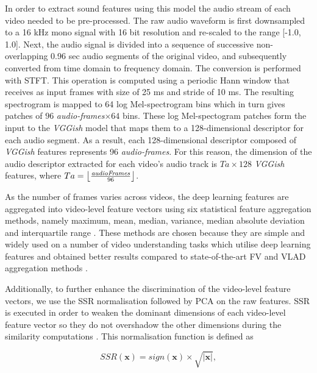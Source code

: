 \documentclass[review]{elsarticle}
\DeclarePairedDelimiter\floor{\lfloor}{\rfloor}
\begin{document}
\begin{enumerate}[label = \Alph*.]
In order to extract sound features using this model the audio stream of each video needed to be pre-processed. The raw audio waveform is first downsampled to a 16 kHz mono signal with 16 bit resolution and re-scaled to the range [-1.0, 1.0]. Next, the audio signal is divided into a sequence of successive non-overlapping 0.96 sec audio segments of the original video, and subsequently converted from time domain to frequency domain. The conversion is performed with \ac{STFT}. This operation is computed using a periodic Hann window that receives as input frames with size of 25 ms and stride of 10 ms. The resulting spectrogram is mapped to 64 log Mel-spectrogram bins which in turn gives patches of $96$ \textit{audio-frames}$\times 64$ bins. These log Mel-spectogram patches form the input to the \textit{VGGish} model that maps them to a 128-dimensional descriptor for each audio segment. As a result, each 128-dimensional descriptor composed of \textit{VGGish} features represents 96 \textit{audio-frames}. For this reason, the dimension of the audio descriptor extracted for each video's audio track is $Ta \times 128$ \textit{VGGish} features, where $Ta = \floor*{\frac{\mathit{audioFrames}}{96}}$.

\end{enumerate}


As the number of frames varies across videos, the deep learning features are aggregated into video-level feature vectors using six statistical feature aggregation methods, namely maximum, mean, median, variance, median absolute deviation and interquartile range \citep{almeida2020visual}. These methods are chosen because they are simple and widely used on a number of video understanding tasks which utilise deep learning features \citep{liu2019use, miech2019howto100m, almeida2020visual} and obtained better results compared to state-of-the-art \ac{FV} and \ac{VLAD} aggregation methods \citep{abu2016youtube,deldjoo2019movie}. 

Additionally, to further enhance the discrimination of the video-level feature vectors, we use the \ac{SSR} normalisation followed by \ac{PCA} on the raw features. \ac{SSR} is executed in order to weaken the dominant dimensions of each video-level feature vector so they do not overshadow the other dimensions during the similarity computations \citep{du2018personalized}. This normalisation function is defined as 

\begin{equation}
    SSR(\mathbf{x}) = sign(\mathbf{x}) \times \sqrt{|\mathbf{x}|},
\end{equation}
\end{document}
